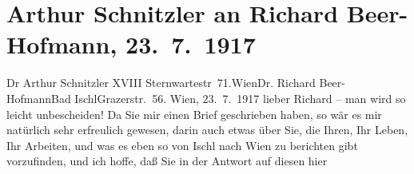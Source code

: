 

         
         \renewcommand{\erwaehntePersonen}{Personen: Richard Beer-Hofmann, Gabriel Beer-Hofmann, Paula Beer-Hofmann, Mirjam Beer-Hofmann, Naëmah Beer-Hofmann, Immanuel Kant, Arthur Kaufmann, Arthur Schopenhauer, Hermine Simandt, Elisabeth Steinrück}
         \renewcommand{\erwaehnteOrte}{Orte: Bad Ischl, Grazer Straße, Hollabrunn, Partenkirchen, Salzburg, Salzkammergut, Sternwartestraße, Wien}
         \renewcommand{\erwaehnteWerke}{}
               \section[Arthur Schnitzler an Richard Beer-Hofmann, 23. 7. 1917]{ Arthur Schnitzler an Richard Beer-Hofmann, 23. 7. 1917}\nopagebreak{}\rehead{ }\begin{ledgroupsized}[t]{13cm}\normalsize\beginnumbering \toendnotes[C]{\smallbreak\pagebreak[2]} 
\toendnotes[C]{\smallbreak}\pstart{}{\pb}Dr Arthur Schnitzler XVIII Sternwartestr 71.\pend{}\pstart{}Wien\pend{}{\bigskip}\pstart{}{\pb}Dr. Richard Beer-Hofmann\pend{}\pstart{}Bad Ischl\pend{}\pstart{}Grazerstr. 56.\pend{}{\bigskip}\pstart
           \raggedleft{}{\pb}Wien, 23. 7. 1917\pend
           \pstart
           lieber Richard – man wird so leicht unbescheiden! Da Sie mir einen
               Brief geschrieben haben, so wär es mir natürlich sehr erfreulich gewesen, darin auch
               etwas über Sie, die Ihren, Ihr Leben, Ihr Arbeiten, und was es eben so von Ischl nach Wien
               zu berichten gibt vorzufinden, und ich hoffe, daß Sie in der Antwort auf diesen hier

\end{ledgroupsized}
